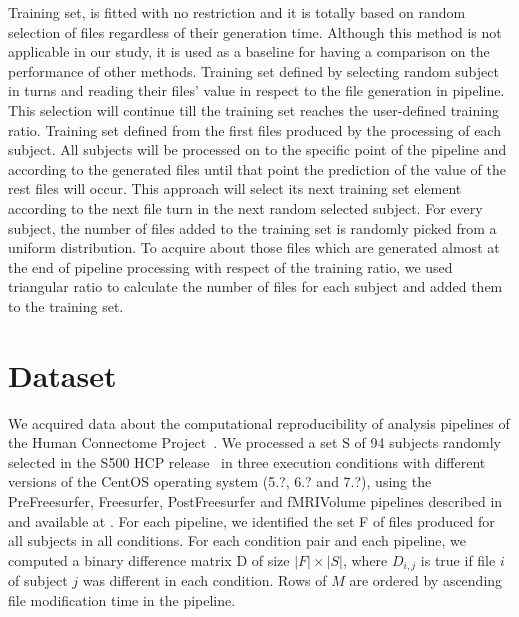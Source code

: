 \documentclass[10pt, conference, compsocconf]{IEEEtran}
\newcommand{\todo}[1]{\marginpar{\parbox{18mm}{\flushleft\tiny\color{red}\textbf{TODO}:
      #1}}}
\begin{document}
Training set, is fitted with no restriction and it is totally based on random selection of files regardless of their generation time. Although this method is not applicable in our study, it is used as a baseline for having a comparison on the performance of other methods. 
Training set defined by selecting random subject in turns and reading their files’ value in respect to the file generation in pipeline. This selection will continue till the training set reaches the user-defined training ratio.
Training set defined from the first files produced by the processing of each subject. All subjects will be processed on to the specific point of the pipeline and according to the generated files until that point the prediction of the value of the rest files will occur.
This approach will select its next training set element according to the next file turn in the next random selected subject.
For every subject, the number of files added to the training set is randomly picked from a uniform distribution.
To acquire about those files which are generated almost at the end of pipeline processing with respect of the training ratio, we used triangular ratio to calculate the number of files for each subject and added them to the training set.

\section{Dataset}

We acquired data about the computational reproducibility of analysis
pipelines of the Human Connectome Project~\cite{general-hcp}. We
processed a set S of 94 subjects randomly selected in the S500 HCP
release~\todo{URL} in three execution conditions with different
versions of the CentOS operating system (5.?, 6.? and 7.?), using the
PreFreesurfer, Freesurfer, PostFreesurfer and fMRIVolume pipelines
described in~\cite{hcp-pipelines} and available at \todo{URL}. For
each pipeline, we identified the set F of files produced for all
subjects in all conditions. For each condition pair and each pipeline,
we computed a binary difference matrix D of size $|F|\times|S|$, where $D_{i,j}$ is true
if file $i$ of subject $j$ was different in each condition. Rows of
$M$ are ordered by ascending file modification time in the pipeline.
\end{document}

